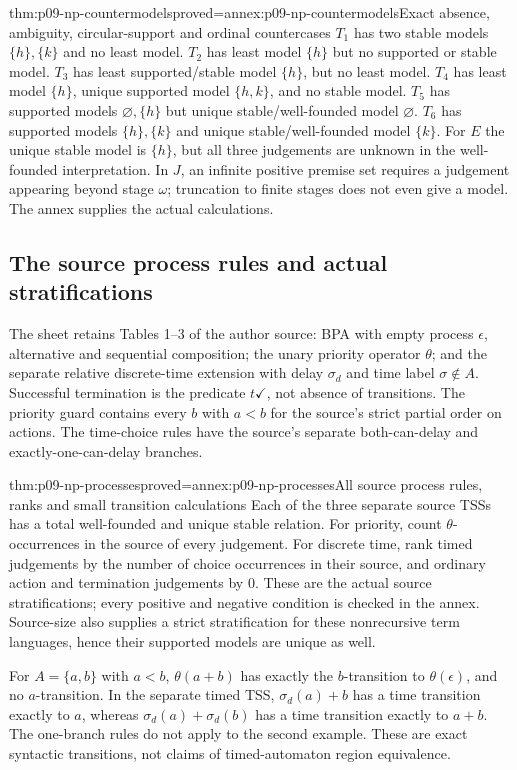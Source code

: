 \begin{hbtheorem}{thm:p09-np-countermodels}{proved=annex:p09-np-countermodels}{Exact absence, ambiguity, circular-support and ordinal countercases}
\(T_1\) has two stable models \(\{h\},\{k\}\) and no
least model. \(T_2\) has least model \(\{h\}\) but no supported
or stable model. \(T_3\) has least supported/stable model
\(\{h\}\), but no least model. \(T_4\) has least model
\(\{h\}\), unique supported model \(\{h,k\}\), and no
stable model. \(T_5\) has supported models \(\varnothing,\{h\}\)
but unique stable/well-founded model \(\varnothing\).
\(T_6\) has supported models \(\{h\},\{k\}\)
and unique stable/well-founded model \(\{k\}\).
For \(E\) the unique stable model is \(\{h\}\), but all three
judgements are unknown in the well-founded interpretation.
In \(J\), an infinite positive premise set requires a judgement
appearing beyond stage \(\omega\); truncation to finite stages
does not even give a model. The annex supplies the actual calculations.
\end{hbtheorem}

\subsection{The source process rules and actual stratifications}

The sheet retains Tables 1--3 of the author source: BPA with empty
process \(\epsilon\), alternative and sequential composition;
the unary priority operator \(\theta\); and the separate relative
discrete-time extension with delay \(\sigma_d\) and time label
\(\sigma\notin A\). Successful termination is the predicate
\(t\checkmark\), not absence of transitions. The priority guard
contains every \(b\) with \(a<b\) for the source's strict partial
order on actions. The time-choice rules have the source's separate
both-can-delay and exactly-one-can-delay branches.


\begin{hbtheorem}{thm:p09-np-processes}{proved=annex:p09-np-processes}{All source process rules, ranks and small transition calculations}
Each of the three separate source TSSs has a total well-founded and
unique stable relation. For priority, count \(\theta\)-occurrences
in the source of every judgement. For discrete time, rank timed
judgements by the number of choice occurrences in their source,
and ordinary action and termination judgements by 0. These are the
actual source stratifications; every positive and negative condition
is checked in the annex. Source-size also supplies a strict
stratification for these nonrecursive term languages, hence their
supported models are unique as well.

For \(A=\{a,b\}\) with \(a<b\), \(\theta(a+b)\) has
exactly the \(b\)-transition to \(\theta(\epsilon)\), and no
\(a\)-transition. In the separate timed TSS,
\(\sigma_d(a)+b\) has a time transition exactly to \(a\),
whereas \(\sigma_d(a)+\sigma_d(b)\) has a time transition
exactly to \(a+b\). The one-branch rules do not apply to the
second example. These are exact syntactic transitions, not claims
of timed-automaton region equivalence.
\end{hbtheorem}

